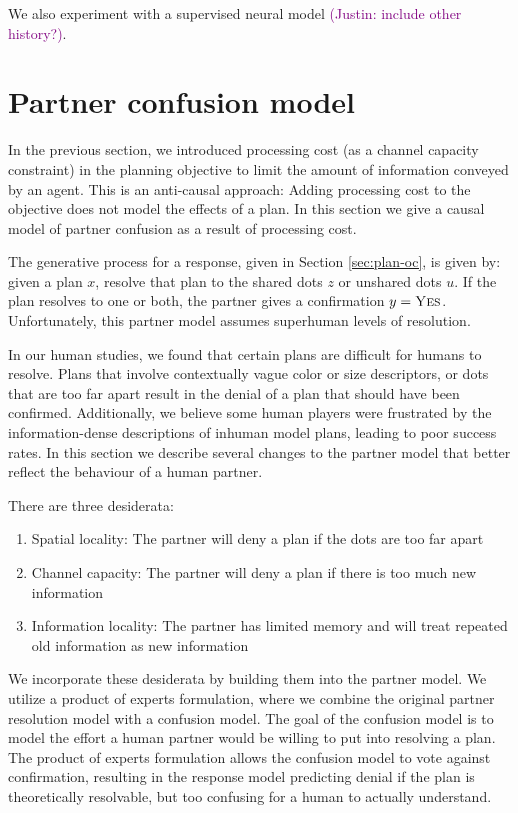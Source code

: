 \documentclass[11pt]{article}
\newcommand{\justin}[1]{{{\textcolor{purple}{(Justin: #1)}}}}
\begin{document}
We also experiment with a supervised neural model \justin{include other history?}.

\section{Partner confusion model}
In the previous section, we introduced processing cost (as a channel capacity constraint) in the planning objective to limit the amount of information conveyed by an agent.
This is an anti-causal approach: Adding processing cost to the objective does not model the effects of a plan.
In this section we give a causal model of partner confusion as a result of processing cost.

The generative process for a response, given in Section \ref{sec:plan-oc}, is given by:
given a plan $x$, resolve that plan to the shared dots $z$ or unshared dots $u$. If the plan resolves to one or both, the partner gives a confirmation $y = \textsc{Yes}$.
Unfortunately, this partner model assumes superhuman levels of resolution.

In our human studies, we found that certain plans are difficult for humans to resolve. Plans that involve contextually vague color or size descriptors, or dots that are too far apart result in the denial of a plan that should have been confirmed.
Additionally, we believe some human players were frustrated by the information-dense descriptions of inhuman model plans, leading to poor success rates.
In this section we describe several changes to the partner model that better reflect the behaviour of a human partner.

There are three desiderata:
\begin{enumerate}
\item Spatial locality: The partner will deny a plan if the dots are too far apart
\item Channel capacity: The partner will deny a plan if there is too much new information
\item Information locality: The partner has limited memory and will treat repeated old information as new information
\end{enumerate}

We incorporate these desiderata by building them into the partner model.
We utilize a product of experts formulation,
where we combine the original partner resolution model
with a confusion model.
The goal of the confusion model is to model the effort a human partner would be willing to put into resolving a plan.
The product of experts formulation allows the confusion model to
vote against confirmation,
resulting in the response model predicting denial if the plan is theoretically resolvable, but too confusing for a human to actually understand.
\end{document}
